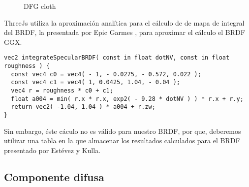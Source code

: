 \begin{figure}[H]
  \vspace{0.5cm}
  \centering
  \caption{DFG cloth}
  \vspace{0.5cm}
\end{figure}

ThreeJs utiliza la aproximaci\'on anal\'itica para el c\'alculo de de mapa de integral del BRDF,
la presentada por Epic Garmes \autocite{shadingmobile}, para aproximar el c\'alculo el BRDF GGX.

\begin{lstlisting}[caption=Apromixaci\'on anal\'itica a la integral del BRDF en ThreeJs]
vec2 integrateSpecularBRDF( const in float dotNV, const in float roughness ) {
  const vec4 c0 = vec4( - 1, - 0.0275, - 0.572, 0.022 );
  const vec4 c1 = vec4( 1, 0.0425, 1.04, - 0.04 );
  vec4 r = roughness * c0 + c1;
  float a004 = min( r.x * r.x, exp2( - 9.28 * dotNV ) ) * r.x + r.y;
  return vec2( -1.04, 1.04 ) * a004 + r.zw;
}
\end{lstlisting}

Sin embargo, \'este c\'aculo no es v\'alido para nuestro BRDF, por que, deberemos utilizar una
tabla en la que almacenar los resultados calculados para el BRDF presentado por Est\'evez y Kulla.


\subsection{Componente difusa}